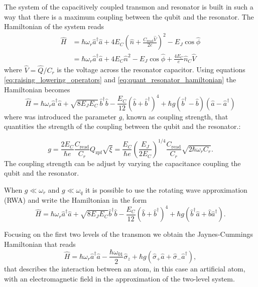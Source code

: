 The system of the capacitively coupled transmon and resonator is built in such a way that there is a maximum coupling between the qubit and the resonator.
The Hamiltonian of the system reads
\begin{align}
    \hat{H} &= \hbar \omega_r \hat{a}^\dagger \hat{a} + 4E_C (\hat{n} + \frac{C_{\text{read}}\hat{V}}{2e})^2- E_J \cos\hat{\phi}\\ 
    &= \hbar \omega_r \hat{a}^\dagger \hat{a} + 4E_C \hat{n}^2 - E_J \cos\hat{\phi} + \frac{4E_C}{e} \hat{n}_C \hat{V}
\end{align}
where $\hat{V} = \hat{Q}/C_r$ is the voltage across the resonator capacitor. Using equations \ref{eq:raising_lowering_operators} and \ref{eq:quant_resonator_hamiltonian} the Hamiltonian becomes
\begin{equation}
    \hat{H} = \hbar \omega_r \hat{a}^\dagger \hat{a}  + \sqrt{8 E_J E_C} \, \hat{b}^\dagger \hat{b} - \frac{E_C}{12} (\hat{b} + \hat{b}^\dagger)^4 + \hbar g (\hat{b}^\dagger - \hat{b})(\hat{a} - \hat{a}^\dagger)
\end{equation}
where was introduced the parameter $g$, known as coupling strength, that quantities the strength of the coupling between the qubit and the resonator.:

\begin{equation}
    g = \frac{2 E_C}{\hbar e} \frac{C_{\text{read}}}{C_r} Q_{\text{zpf}} \sqrt{\xi} = \frac{E_C}{\hbar e} \left( \frac{E_J}{2 E_C} \right)^{1/4} \frac{C_{\text{read}}}{C_r} \sqrt{2 \hbar \omega_r C_r}.
\end{equation} 
The coupling strength can be adjust by varying the capacitance coupling the qubit and the resonator.

When $g\ll\omega_r$ and $g\ll\omega_q$ it is possible to use the rotating wave approximation (RWA) and write the Hamiltonian in the form
\begin{equation}
    \hat{H} = \hbar \omega_r \hat{a}^\dagger \hat{a} + \sqrt{8E_J E_C} \hat{b}^\dagger \hat{b} - \frac{E_C}{12} (\hat{b} + \hat{b}^\dagger)^4 + \hbar g (\hat{b}^\dagger \hat{a} + \hat{b} \hat{a}^\dagger).
\end{equation}

Focusing on the first two levels of the transmon we obtain the Jaynes-Cummings Hamiltonian that reads
\begin{equation}\label{eq:Jaynes-Cummings}
    \hat{H} = \hbar \omega_r \hat{a}^\dagger \hat{a} - \frac{\hbar \omega_{01}}{2} \hat{\sigma}_z + \hbar g (\hat{\sigma}_+ \hat{a} + \hat{\sigma}_- \hat{a}^\dagger),
\end{equation}
that describes the interaction between an atom, in this case an artificial atom, with an electromagnetic field in the approximation of the two-level system.

